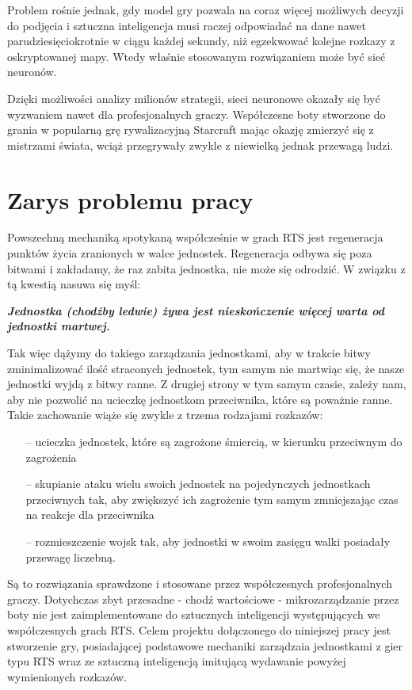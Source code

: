 \documentclass[12pt]{report}
\begin{document}
Problem rośnie jednak, gdy model gry pozwala na coraz więcej możliwych decyzji do podjęcia i sztuczna inteligencja musi raczej odpowiadać na dane nawet parudziesięciokrotnie w ciągu każdej sekundy, niż egzekwować kolejne rozkazy z oskryptowanej mapy. Wtedy właśnie stosowanym rozwiązaniem może być sieć neuronów.

Dzięki możliwości analizy milionów strategii, sieci neuronowe okazały się być wyzwaniem nawet dla profesjonalnych graczy. Współczesne boty stworzone do grania w popularną grę rywalizacyjną Starcraft mając okazję zmierzyć się z mistrzami świata, wciąż przegrywały zwykle z niewielką jednak przewagą ludzi.

\section {Zarys problemu pracy}
Powszechną mechaniką spotykaną współcześnie w grach RTS jest regeneracja punktów życia zranionych w walce jednostek. Regeneracja odbywa się poza bitwami i zakładamy, że raz zabita jednostka, nie może się odrodzić. W związku z tą kwestią nasuwa się myśl:

\textbf{\textit{Jednostka (chodźby ledwie) żywa jest nieskończenie więcej warta od jednostki martwej.}}

Tak więc dążymy do takiego zarządzania jednostkami, aby w trakcie bitwy zminimalizować ilość straconych jednostek, tym samym nie martwiąc się, że nasze jednostki wyjdą z bitwy ranne. Z drugiej strony w tym samym czasie, zależy nam, aby nie pozwolić na ucieczkę jednostkom przeciwnika, które są poważnie ranne. Takie zachowanie wiąże się zwykle z trzema rodzajami rozkazów:
\begin{itemize}
\item[--] ucieczka jednostek, które są zagrożone śmiercią, w kierunku przeciwnym do zagrożenia
\item[--] skupianie ataku wielu swoich jednostek na pojedynczych jednostkach przeciwnych tak, aby zwiększyć ich zagrożenie tym samym zmniejszając czas na reakcje dla przeciwnika
\item[--] rozmieszczenie wojsk tak, aby jednostki w swoim zasięgu walki posiadały przewagę liczebną.
\end{itemize}

Są to rozwiązania sprawdzone i stosowane przez współczesnych profesjonalnych graczy. Dotychczas zbyt przesadne - chodź wartościowe - mikrozarządzanie przez boty nie jest zaimplementowane do sztucznych inteligencji występujących we współczesnych grach  RTS. Celem projektu dołączonego do niniejszej pracy jest stworzenie gry, posiadającej podstawowe mechaniki zarządzaia jednostkami z gier typu RTS wraz ze sztuczną inteligencją imitującą wydawanie powyżej wymienionych rozkazów.
\end{document}
